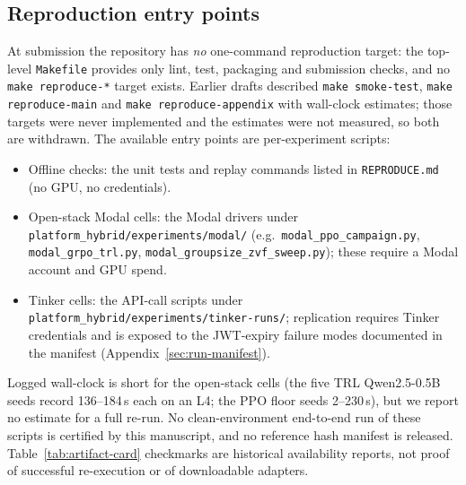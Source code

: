 \subsection{Reproduction entry points}
\label{sec:repro-onecmd}

At submission the repository has \emph{no} one-command reproduction target:
the top-level \texttt{Makefile} provides only lint, test, packaging and
submission checks, and no \texttt{make reproduce-*} target exists. Earlier
drafts described \texttt{make smoke-test}, \texttt{make reproduce-main} and
\texttt{make reproduce-appendix} with wall-clock estimates; those targets were
never implemented and the estimates were not measured, so both are withdrawn.
The available entry points are per-experiment scripts:
\begin{itemize}\setlength\itemsep{1pt}
  \item Offline checks: the unit tests and replay commands listed in
        \texttt{REPRODUCE.md} (no GPU, no credentials).
  \item Open-stack Modal cells: the Modal drivers under
        \texttt{platform\_hybrid/\allowbreak{}experiments/\allowbreak{}modal/\allowbreak{}} (e.g.\
        \texttt{modal\_ppo\_campaign.py}, \texttt{modal\_grpo\_trl.py},
        \texttt{modal\_groupsize\_zvf\_sweep.py}); these require a Modal
        account and GPU spend.
  \item Tinker cells: the API-call scripts under
        \texttt{platform\_hybrid/\allowbreak{}experiments/\allowbreak{}tinker-runs/\allowbreak{}}; replication
        requires Tinker credentials and is exposed to the JWT-expiry failure
        modes documented in the manifest (Appendix~\ref{sec:run-manifest}).
\end{itemize}
Logged wall-clock is short for the open-stack cells (the five TRL
Qwen2.5-0.5B seeds record 136--184\,s each on an L4; the PPO floor seeds
2--230\,s), but we report no estimate for a full re-run.
No clean-environment end-to-end run of these scripts is certified by this
manuscript, and no reference hash manifest is released.
Table~\ref{tab:artifact-card} checkmarks are historical availability reports,
not proof of successful re-execution or of downloadable adapters.
